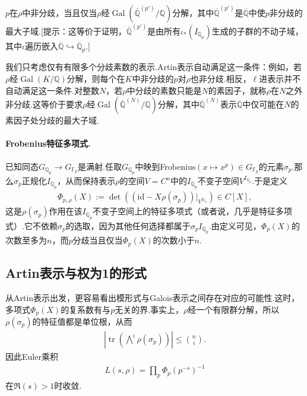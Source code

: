 \begin{exercise*}

$p$在$\rho$中非分歧，当且仅当$\rho$经$\operatorname{Gal}(\overline{\mathbb Q}^{(p')}/\mathbb Q)$分解，其中$\overline{\mathbb Q}^{(p')}$是$\overline{\mathbb Q}$中使$p$非分歧的最大子域.[提示：这等价于证明，$\overline{\mathbb Q}^{(p')}$是由所有$\iota_*(I_{\mathbb Q_p})$生成的子群的不动子域，其中$\iota$遍历嵌入$\overline{\mathbb Q}\hookrightarrow\overline{\mathbb Q}_p$.]

\end{exercise*}

我们只考虑仅有有限多个分歧素数的表示.Artin表示自动满足这一条件：例如，若$\rho$经$\operatorname{Gal}(K/\mathbb Q)$分解，则每个在$K$中非分歧的$p$对$\rho$也非分歧.相反，$\ell$进表示并不自动满足这一条件.对整数$N$，若$\rho$中分歧的素数只能是$N$的素因子，就称$\rho$在$N$之外非分歧.这等价于要求$\rho$经$\operatorname{Gal}(\overline{\mathbb Q}^{(N)}/\mathbb Q)$分解，其中$\overline{\mathbb Q}^{(N)}$表示$\overline{\mathbb Q}$中仅可能在$N$的素因子处分歧的最大子域.



\paragraph{Frobenius特征多项式.}

已知同态$G_{\mathbb Q_p}\longrightarrow G_{\mathbb F_p}$是满射.任取$G_{\mathbb Q_p}$中映到Frobenius$(x\mapsto x^p)\in G_{\mathbb F_p}$的元素$\sigma_p$.那么$\sigma_p$正规化$I_{\mathbb Q_p}$，从而保持表示$\rho$的空间$V=C^n$中的$I_{\mathbb Q_p}$不变子空间$V^{I_{\mathbb Q_p}}$.于是定义
\begin{align*}
\Phi_{p,\rho}(X):=\det\left((\mathrm{id}-X\rho(\sigma_p))\big|_{V^{I_{\mathbb Q_p}}}\right)\in C[X],
\end{align*}
这是$\rho(\sigma_p)$作用在该$I_{\mathbb Q_p}$不变子空间上的特征多项式（或者说，几乎是特征多项式）.它不依赖$\sigma_p$的选取，因为其他任何选择都属于$\sigma_p I_{\mathbb Q_p}$.由定义可见，$\Phi_p(X)$的次数至多为$n$，而$p$分歧当且仅当$\Phi_p(X)$的次数小于$n$.



\subsection{Artin表示与权为1的形式}\label{sec:modular-2-1-2}

从Artin表示出发，更容易看出模形式与Galois表示之间存在对应的可能性.这时，多项式$\Phi_p(X)$的复系数有与$p$无关的界.事实上，$\rho$经一个有限群分解，所以$\rho(\sigma_p)$的特征值都是单位根，从而
\begin{align*}
\left|\operatorname{tr}\left(\bigwedge^i\rho(\sigma_p)\right)\right|\leqslant\binom ni.
\end{align*}
因此Euler乘积
\begin{align*}
L(s,\rho)=\prod_p\Phi_p(p^{-s})^{-1}
\end{align*}
在$\Re(s)>1$时收敛.

